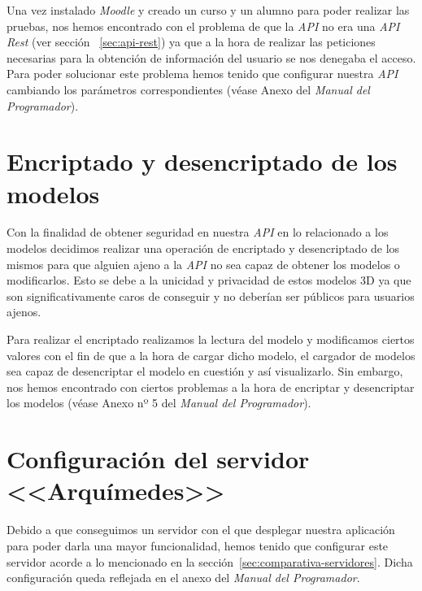Una vez instalado \textit{Moodle} y creado un curso y un alumno para poder realizar las pruebas, nos hemos encontrado con el problema de que la \textit{API} no era una \textit{API Rest} (ver sección ~\ref{sec:api-rest}) ya que a la hora de realizar las peticiones necesarias para la obtención de información del usuario se nos denegaba el acceso. Para poder solucionar este problema hemos tenido que configurar nuestra \textit{API} cambiando los parámetros correspondientes (véase Anexo del \textit{Manual del Programador}).

\section{Encriptado y desencriptado de los modelos}
Con la finalidad de obtener seguridad en nuestra \textit{API} en lo relacionado a los modelos decidimos realizar una operación de encriptado y desencriptado de los mismos para que alguien ajeno a la \textit{API} no sea capaz de obtener los modelos o modificarlos. Esto se debe a la unicidad y privacidad de estos modelos 3D ya que son significativamente caros de conseguir y no deberían ser públicos para usuarios ajenos.

Para realizar el encriptado realizamos la lectura del modelo y modificamos ciertos valores con el fin de que a la hora de cargar dicho modelo, el cargador de modelos sea capaz de desencriptar el modelo en cuestión y así visualizarlo. Sin embargo, nos hemos encontrado con ciertos problemas a la hora de encriptar y desencriptar los modelos (véase Anexo nº 5 del \textit{Manual del Programador}).

\section{Configuración del servidor <<Arquímedes>>}
Debido a que conseguimos un servidor con el que desplegar nuestra aplicación para poder darla una mayor funcionalidad, hemos tenido que configurar este servidor acorde a lo mencionado en la sección~\ref{sec:comparativa-servidores}. Dicha configuración queda reflejada en el anexo del \textit{Manual del Programador}.